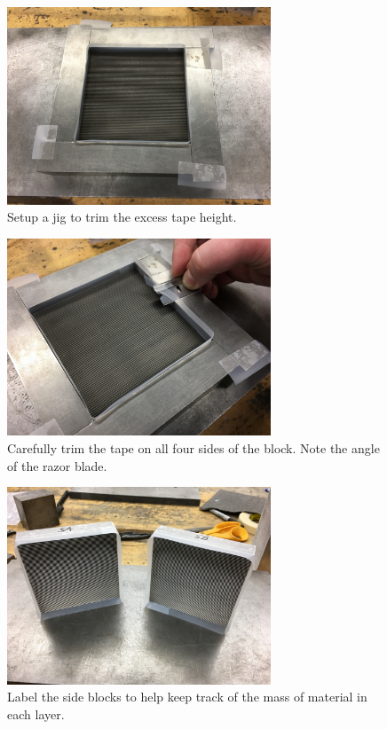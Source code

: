 \begin{figure}
	\centering
        \includegraphics[width=0.7\textwidth]{appendix_sample_prep/dds_trim_setup.jpg}
   	\caption{Setup a jig to trim the excess tape height.}
  	\label{Fig:dds_trim_setup}
\end{figure}

\begin{figure}
	\centering
        \includegraphics[width=0.7\textwidth]{appendix_sample_prep/dds_tape_trim.jpg}
   	\caption{Carefully trim the tape on all four sides of the block. Note the angle of the razor blade.}
  	\label{Fig:dds_tape_trim}
\end{figure}

\begin{figure}
	\centering
        \includegraphics[width=0.7\textwidth]{appendix_sample_prep/dds_blocks_labeled.jpg}
   	\caption{Label the side blocks to help keep track of the mass of material in each layer.}
  	\label{Fig:dds_blocks_labeled}
\end{figure}

